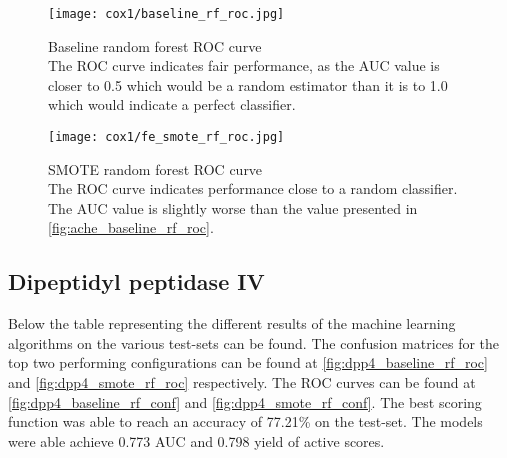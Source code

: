 \begin{figure}[H]
    \begin{center}
        \captionsetup{justification=centering}
        \texttt{[image: cox1/baseline\_rf\_roc.jpg]}
        \caption[]{Baseline random forest ROC curve\\
            The ROC curve indicates fair performance, as the AUC value is closer to 0.5 which would be a random estimator than it is to 1.0 which would indicate a perfect classifier.
        }
        \label{fig:cox1_baseline_rf_roc}
    \end{center}

\end{figure}

\begin{figure}[H]
    \begin{center}
        \captionsetup{justification=centering}
        \texttt{[image: cox1/fe\_smote\_rf\_roc.jpg]}
        \caption[]{SMOTE random forest ROC curve\\
            The ROC curve indicates performance close to a random classifier. The AUC value is slightly worse than the value presented in \ref*{fig:ache_baseline_rf_roc}.
        }
        \label{fig:cox1_smote_rf_roc}
    \end{center}
\end{figure}

\subsection{Dipeptidyl peptidase IV}
Below the table representing the different results of the machine learning algorithms on the various test-sets can be found.
The confusion matrices for the top two performing configurations can be found at \ref{fig:dpp4_baseline_rf_roc} and \ref{fig:dpp4_smote_rf_roc}
respectively. The ROC curves can be found at \ref{fig:dpp4_baseline_rf_conf} and \ref{fig:dpp4_smote_rf_conf}.
The best scoring function was able to reach an accuracy of 77.21\% on the test-set. The models were able achieve 0.773 AUC and 0.798 yield of active scores.


